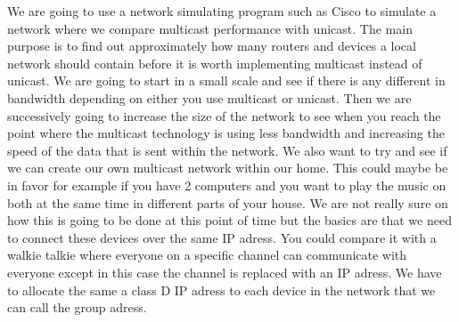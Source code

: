 \documentclass[9pt,a4paper]{acmproc}
\begin{document}
We are going to use a network simulating program such as Cisco to simulate a network where we compare multicast performance with unicast. The main purpose is to find out approximately how many routers and devices a local network should contain before it is worth implementing multicast instead of unicast. We are going to start in a small scale and see if there is any different in bandwidth depending on either you use multicast or unicast. Then we are successively going to increase the size of the network to see when you reach the point where the multicast technology is using less bandwidth and increasing the speed of the data that is sent within the network.
We also want to try and see if we can create our own multicast network within our home. This could maybe be in favor for example if you have 2 computers and you want to play the music on both at the same time in different parts of your house. We are not really sure on how this is going to be done at this point of time but the basics are that we need to connect these devices over the same IP adress. You could compare it with a walkie talkie where everyone on a specific channel can communicate with everyone except in this case the channel is replaced with an IP adress. We have to allocate the same a class D IP adress to each device in the network that we can call the group adress. 
\end{document}

